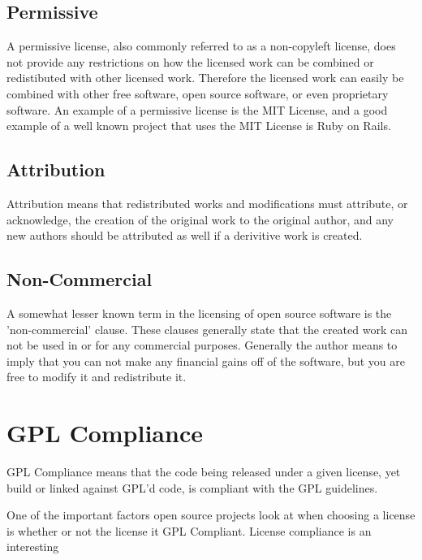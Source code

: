 \documentclass[12pt,letterpaper]{article}
\begin{document}
\subsection*{Permissive}
A permissive license, also commonly referred to as a non-copyleft
license, does not provide any restrictions on how the licensed work can
be combined or redistibuted with other licensed work. Therefore the
licensed work can easily be combined with other free software, open
source software, or even proprietary software. An example of a
permissive license is the MIT License, and a good example of a well
known project that uses the MIT License is Ruby on Rails.

\subsection*{Attribution}
Attribution means that redistributed works and modifications must
attribute, or acknowledge, the creation of the original work to the
original author, and any new authors should be attributed as well if a
derivitive work is created.

\subsection*{Non-Commercial}
A somewhat lesser known term in the licensing of open source software is
the 'non-commercial' clause. These clauses generally state that the
created work can not be used in or for any commercial purposes.
Generally the author means to imply that you can not make any financial
gains off of the software, but you are free to modify it and
redistribute it.


\section*{GPL Compliance}
GPL Compliance means that the code being released under a given license, yet build or linked against GPL'd code, is compliant with the GPL guidelines.

One of the important factors open source projects look at when choosing a license is whether or not the license it GPL Compliant. License compliance is an interesting 


\pagebreak

\nocite{*}



\end{document}
